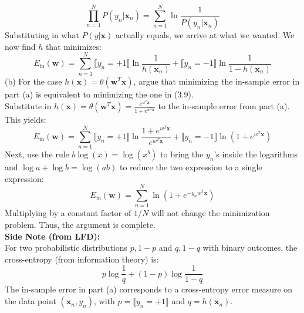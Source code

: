 \documentclass[12pt]{article}
\begin{document}
	\begin{equation*}
	\prod_{n=1}^{N} P(y_n|\boldsymbol{x}_n) = \sum_{n=1}^{N} \ln \frac{1}{P(y_n|\boldsymbol{x}_n)}
	\end{equation*}
	Substituting in what $P(y|\boldsymbol{x})$ actually equals, we arrive at what we wanted. We now find $h$ that minimizes:
	\begin{equation*}
	E_{\text{in}}(\boldsymbol{w})= \sum_{n=1}^{N} \llbracket y_n=+1\rrbracket \ln\frac{1}{h(\boldsymbol{x}_n)} + \llbracket y_n=-1\rrbracket \ln \frac{1}{1-h(\boldsymbol{x}_n)}
	\end{equation*}
	(b) For the case $h(\boldsymbol{x}) = \theta (\boldsymbol{w}^T\boldsymbol{x})$, argue that minimizing the in-sample error in part (a) is equivalent to minimizing the one in (3.9). \\
	Substitute in $h(\boldsymbol{x}) = \theta (\boldsymbol{w}^T\boldsymbol{x}) = \frac{e^{w^T \boldsymbol{x}}}{1+e^{w^T \boldsymbol{x}}}$ to the in-sample error from part (a). This yields:
	\begin{equation*}
	E_{\text{in}}(\boldsymbol{w})= \sum_{n=1}^{N} \llbracket y_n=+1\rrbracket \ln\frac{1+e^{w^T \boldsymbol{x}}}{e^{w^T \boldsymbol{x}}} + \llbracket y_n=-1\rrbracket \ln (1+e^{w^T \boldsymbol{x}})
	\end{equation*}
	Next, use the rule $b\log(x)=\log(x^b)$ to bring the $y_n$'s inside the logarithms and $\log a + \log b = \log(ab)$ to reduce the two expression to a single expression:
	\begin{equation*}
	E_{\text{in}}(\boldsymbol{w})= \sum_{n=1}^{N} \ln (1+e^{-y_n w^T \boldsymbol{x}})
	\end{equation*}
	Multiplying by a constant factor of $1/N$ will not change the minimization problem. Thus, the argument is complete.
	\\
	\textbf{Side Note (from LFD):} \\
	For two probabilistic distributions ${p, 1-p}$ and ${q, 1-q }$ with binary outcomes, the cross-entropy (from information theory) is:
	\begin{equation*}
		p\log\frac{1}{q} + (1-p)\log\frac{1}{1-q}
	\end{equation*}
	The in-sample error in part (a) corresponds to a cross-entropy error measure on the data point $(\boldsymbol{x}_n, y_n)$, with $p=\llbracket y_n=+1\rrbracket$ and $q=h(\boldsymbol{x}_n)$.
	
	
	
	
\end{document}
